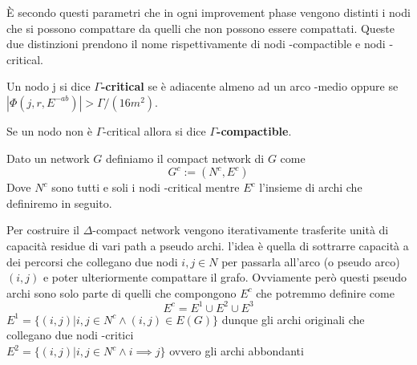     È secondo questi parametri che in ogni improvement phase vengono distinti i nodi che si possono compattare da quelli che non possono essere compattati. Queste due distinzioni prendono il nome rispettivamente di nodi \gmm-compactible e nodi \gmm-critical. 
    \begin{definition}
        
        Un nodo j si dice \textbf{$\Gamma$-critical} se è adiacente almeno ad un arco \gmm-medio oppure se $|\Phi (j, r, E^{-ab})| > \Gamma/(16m^2)$.

        Se un nodo non è $\Gamma$-critical allora si dice \textbf{$\Gamma$-compactible}.

        \vspace*{7pt}
        Dato un network $G$ definiamo il \gmm\-compact network di $G$ come \[G^c := (N^c, E^c)\]
        Dove $N^c$ sono tutti e soli i nodi \gmm-critical mentre $E^c$ l'insieme di archi che definiremo in seguito.
    \end{definition}
    Per costruire il $\Delta$-compact network vengono iterativamente trasferite unità di capacità residue di vari path a pseudo archi. 
    l'idea è quella di sottrarre capacità a dei percorsi che collegano due nodi $i,j\in N$ per passarla all'arco (o pseudo arco) $(i,j)$ e poter ulteriormente compattare il grafo.
    Ovviamente però questi pseudo archi sono solo parte di quelli che compongono $E^c$ che potremmo definire come 
    \[E^c = E^1\cup E^2 \cup E^3\]
    $E^1 = \{(i,j) | i,j\in N^c \land (i,j) \in E(G)\}$ dunque gli archi originali che collegano due nodi \gmm-critici\\
    $E^2 = \{(i,j) | i,j\in N^c \land i\implies j\}$ ovvero gli archi abbondanti 

